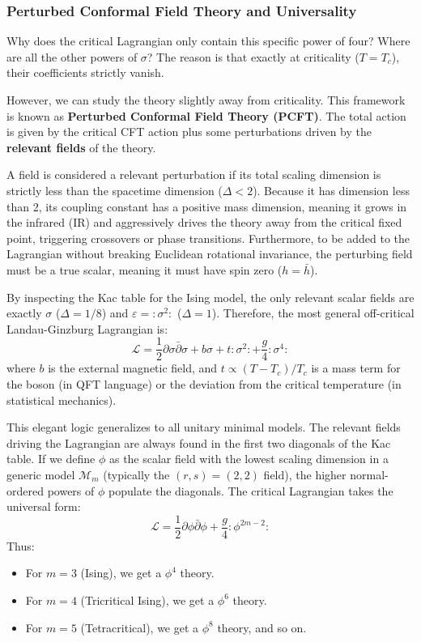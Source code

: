 \subsubsection{Perturbed Conformal Field Theory and Universality}

Why does the critical Lagrangian only contain this specific power of four? Where are all the other powers of \(\sigma\)? The reason is that exactly at criticality (\(T = T_c\)), their coefficients strictly vanish.

However, we can study the theory slightly away from criticality. This framework is known as \textbf{Perturbed Conformal Field Theory (PCFT)}. The total action is given by the critical CFT action plus some perturbations driven by the \textbf{relevant fields} of the theory.

A field is considered a relevant perturbation if its total scaling dimension is strictly less than the spacetime dimension (\(\Delta < 2\)). Because it has dimension less than 2, its coupling constant has a positive mass dimension, meaning it grows in the infrared (IR) and aggressively drives the theory away from the critical fixed point, triggering crossovers or phase transitions. Furthermore, to be added to the Lagrangian without breaking Euclidean rotational invariance, the perturbing field must be a true scalar, meaning it must have spin zero (\(h = \bar{h}\)).

By inspecting the Kac table for the Ising model, the only relevant scalar fields are exactly \(\sigma\) (\(\Delta = 1/8\)) and \(\varepsilon = :\sigma^2:\) (\(\Delta = 1\)). Therefore, the most general off-critical Landau-Ginzburg Lagrangian is:
\[
    \mathcal{L} = \frac{1}{2}\partial\sigma \bar{\partial}\sigma + b\sigma + t:\sigma^2: + \frac{g}{4}:\sigma^4:
\]
where \(b\) is the external magnetic field, and \(t \propto (T - T_c)/T_c\) is a mass term for the boson (in QFT language) or the deviation from the critical temperature (in statistical mechanics).

This elegant logic generalizes to all unitary minimal models. The relevant fields driving the Lagrangian are always found in the first two diagonals of the Kac table. If we define \(\phi\) as the scalar field with the lowest scaling dimension in a generic model \(\mathcal{M}_m\) (typically the \((r,s) = (2,2)\) field), the higher normal-ordered powers of \(\phi\) populate the diagonals. The critical Lagrangian takes the universal form:
\[
    \mathcal{L} = \frac{1}{2}\partial\phi \bar{\partial}\phi + \frac{g}{4} :\phi^{2m-2}:
\]
Thus:
\begin{itemize}
    \item For \(m=3\) (Ising), we get a \(\phi^4\) theory.
    \item For \(m=4\) (Tricritical Ising), we get a \(\phi^6\) theory.
    \item For \(m=5\) (Tetracritical), we get a \(\phi^8\) theory, and so on.
\end{itemize}

